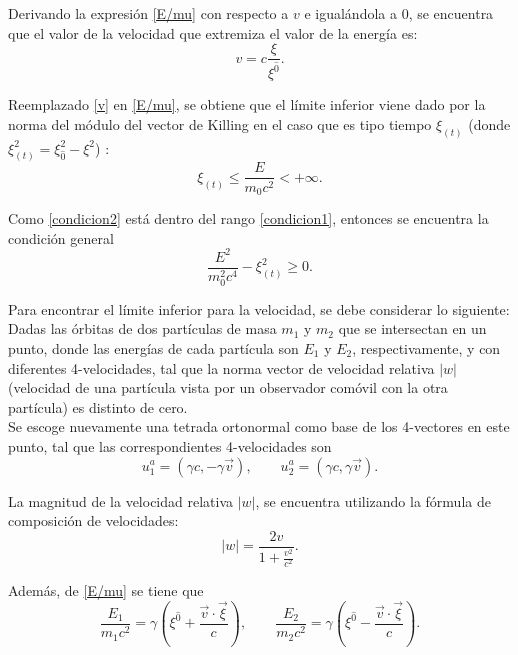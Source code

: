 Derivando la expresión \eqref{E/mu} con respecto a $v$ e igualándola a 0, se encuentra que el valor de la velocidad que extremiza el valor de la energía es:
\begin{equation}\label{v}
v=c\frac{\xi}{\xi^{\hat{0}}}.
\end{equation}

Reemplazado \eqref{v} en \eqref{E/mu}, se obtiene que el límite inferior viene dado por la norma del módulo del vector de Killing en el caso que es tipo tiempo $\xi_{(t)}$ (donde $\xi^2_{(t)}=\xi_{\hat{0}}^2-\xi^2$) :
\begin{equation}\label{condicion2}
\xi_{(t)}\leq  \frac{E}{m_0c^2}<+\infty.
\end{equation}

Como \eqref{condicion2} está dentro del rango \eqref{condicion1}, entonces se encuentra la condición general
\begin{equation}
\frac{E^{2}}{m_0^2c^4}-\xi_{(t)}^2 \geq 0.
\end{equation}

Para encontrar el límite inferior para la velocidad, se debe considerar lo siguiente: Dadas las órbitas de dos partículas de masa $m_1$ y $m_2$ que se intersectan en un punto, donde las energías de cada partícula son $E_1$ y $E_2$, respectivamente, y con diferentes 4-velocidades, tal que la norma vector de velocidad relativa $|w|$ (velocidad de una partícula vista por un observador comóvil con la otra partícula) es distinto de cero.\\

Se escoge nuevamente una tetrada ortonormal como base de los 4-vectores en este punto, tal que las correspondientes 4-velocidades son
\begin{equation}
u_1^{a}=\left(\gamma c, -\gamma \vec{v} \right), \qquad u_2^{a}=\left(\gamma c, \gamma \vec{v}\right).
\end{equation}

La magnitud de la velocidad relativa $|w|$, se encuentra utilizando la fórmula de composición de velocidades:
\begin{equation}\label{w}
|w|=\frac{2v}{1+\frac{v^2}{c^2}}.
\end{equation}

Además, de \eqref{E/mu} se tiene que
\begin{equation}\label{sistema}
\frac{E_1}{m_1c^2}=\gamma\left(\xi^{\hat{0}}+\frac{\vec{v} \cdot \vec{\xi}}{c} \right), \qquad \frac{E_2}{m_2c^2}=\gamma\left(\xi^{\hat{0}}-\frac{\vec{v} \cdot \vec{\xi}}{c} \right).
\end{equation}

